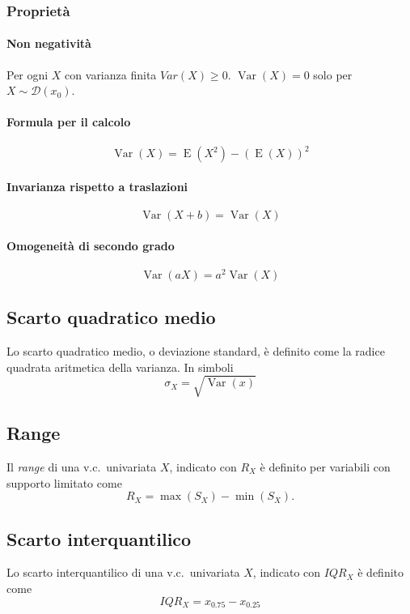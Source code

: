 \documentclass[11pt,a4paper,twoside]{article}
\let\geq\geqslant%
\newcommand\D{\mathcal{D}}
\DeclareMathOperator{\Var}{Var}
\DeclareMathOperator{\E}{E}
\begin{document}
\subsubsection{Proprietà}

\paragraph{Non negatività} Per ogni \(X\) con varianza finita
\(Var(X)\geq 0\).  \(\Var(X) = 0\) solo per \(X\sim \D(x_0)\).

\paragraph{Formula per il calcolo}
\[
  \Var(X) = \E(X^2) - ( \E(X) )^2
\]

\paragraph{Invarianza rispetto a traslazioni}
\[
  \Var(X+b) = \Var(X)
\]

\paragraph{Omogeneità di secondo grado}
\[
  \Var(aX) = a^2 \Var(X)
\]

\subsection{Scarto quadratico medio}

Lo scarto quadratico medio, o deviazione standard, è definito come la
radice quadrata aritmetica della varianza.  In simboli
\[
  \sigma_X = \sqrt{\Var(x)}
\]

\subsection{Range}

Il \textit{range} di una v.c.\ univariata \(X\), indicato con \(R_X\)
è definito per variabili con supporto limitato come
\[
  R_X = \max(S_X) - \min(S_X).
\]

\subsection{Scarto interquantilico}
Lo scarto interquantilico di una v.c.\ univariata \(X\), indicato con
\(IQR_X\) è definito come
\[
  IQR_X = x_{0.75} - x_{0.25}
\]
\end{document}
